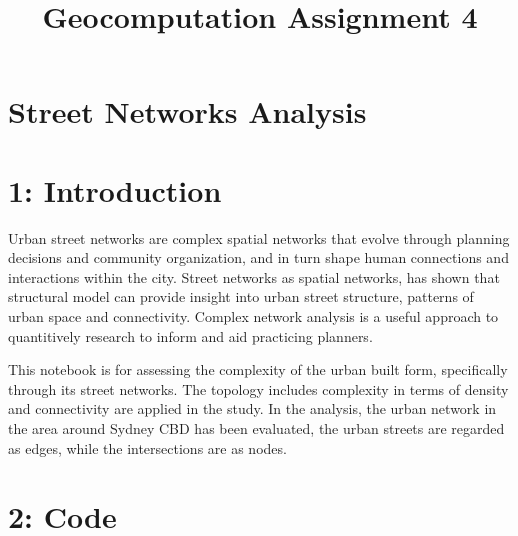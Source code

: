 \documentclass[11pt]{article}
\title{Geocomputation Assignment 4}
\begin{document}
    
    
    \maketitle
    
    

    
    \section{Street Networks Analysis}\label{street-networks-analysis}

    \section{1: Introduction}\label{introduction}

Urban street networks are complex spatial networks that evolve through
planning decisions and community organization, and in turn shape human
connections and interactions within the city. Street networks as spatial
networks, has shown that structural model can provide insight into urban
street structure, patterns of urban space and connectivity. Complex
network analysis is a useful approach to quantitively research to inform
and aid practicing planners.

This notebook is for assessing the complexity of the urban built form,
specifically through its street networks. The topology includes
complexity in terms of density and connectivity are applied in the
study. In the analysis, the urban network in the area around Sydney CBD
has been evaluated, the urban streets are regarded as edges, while the
intersections are as nodes.

    \section{2: Code}\label{code}
\end{document}
